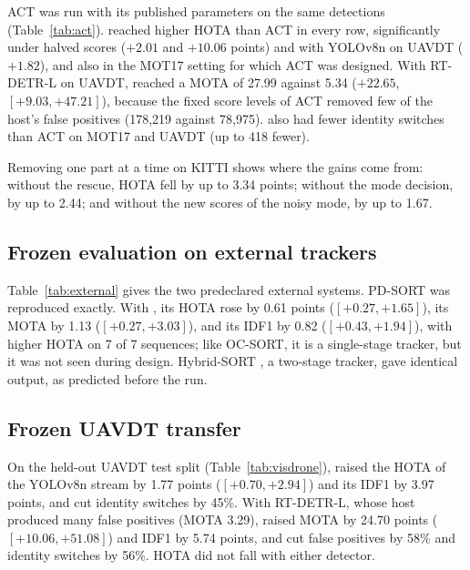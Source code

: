 ACT \cite{act2026adaptive} was run with its published parameters on the same detections
(Table~\ref{tab:act}). \scl{} reached higher HOTA than ACT in every row, significantly under halved
scores ($+2.01$ and $+10.06$ points) and with YOLOv8n on UAVDT ($+1.82$), and also in the MOT17
setting for which ACT was designed. With RT-DETR-L on UAVDT, \scl{} reached a MOTA of 27.99 against
5.34 ($+22.65$, $[+9.03,+47.21]$), because the fixed score levels of ACT removed few of the host's
false positives (178,219 against 78,975). \scl{} also had fewer identity switches than ACT on
MOT17 and UAVDT (up to 418 fewer).

Removing one part at a time on KITTI shows where the gains come from: without the rescue, HOTA
fell by up to 3.34 points; without the mode decision, by up to 2.44; and without the new scores of
the noisy mode, by up to 1.67.


\subsection{Frozen evaluation on external trackers}\label{sec:external}

Table~\ref{tab:external} gives the two predeclared external systems. PD-SORT \cite{wang2025pdsort}
was reproduced exactly. With \scl{}, its HOTA rose by 0.61 points ($[+0.27,+1.65]$), its MOTA by
1.13 ($[+0.27,+3.03]$), and its IDF1 by 0.82 ($[+0.43,+1.94]$), with higher HOTA on 7 of 7
sequences; like OC-SORT, it is a single-stage tracker, but it was not seen during design.
Hybrid-SORT \cite{yang2024hybridsort}, a two-stage tracker, gave identical output, as predicted
before the run.


\subsection{Frozen UAVDT transfer}\label{sec:visdrone}

On the held-out UAVDT test split (Table~\ref{tab:visdrone}), \scl{} raised the HOTA of the YOLOv8n
stream by 1.77 points ($[+0.70,+2.94]$) and its IDF1 by 3.97 points, and cut identity switches by
45\%. With RT-DETR-L, whose host produced many false positives (MOTA 3.29), \scl{} raised MOTA by
24.70 points ($[+10.06,+51.08]$) and IDF1 by 5.74 points, and cut false positives by 58\% and
identity switches by 56\%. HOTA did not fall with either detector.

